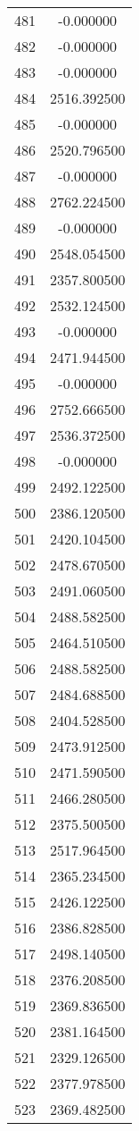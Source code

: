 \documentclass[12pt]{article}
\begin{document}
\begin{longtable}{@{}cc@{}}
481 & -0.000000 \\
482 & -0.000000 \\
483 & -0.000000 \\
484 & 2516.392500 \\
485 & -0.000000 \\
486 & 2520.796500 \\
487 & -0.000000 \\
488 & 2762.224500 \\
489 & -0.000000 \\
490 & 2548.054500 \\
491 & 2357.800500 \\
492 & 2532.124500 \\
493 & -0.000000 \\
494 & 2471.944500 \\
495 & -0.000000 \\
496 & 2752.666500 \\
497 & 2536.372500 \\
498 & -0.000000 \\
499 & 2492.122500 \\
500 & 2386.120500 \\
501 & 2420.104500 \\
502 & 2478.670500 \\
503 & 2491.060500 \\
504 & 2488.582500 \\
505 & 2464.510500 \\
506 & 2488.582500 \\
507 & 2484.688500 \\
508 & 2404.528500 \\
509 & 2473.912500 \\
510 & 2471.590500 \\
511 & 2466.280500 \\
512 & 2375.500500 \\
513 & 2517.964500 \\
514 & 2365.234500 \\
515 & 2426.122500 \\
516 & 2386.828500 \\
517 & 2498.140500 \\
518 & 2376.208500 \\
519 & 2369.836500 \\
520 & 2381.164500 \\
521 & 2329.126500 \\
522 & 2377.978500 \\
523 & 2369.482500 \\

\end{longtable}
\end{document}
